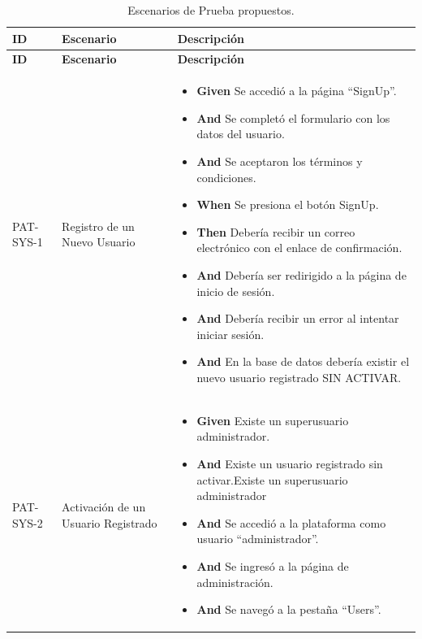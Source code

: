 \begin{longtable}{|p{1cm}|p{2.5cm}|p{12cm}|}
    \caption{Escenarios de Prueba propuestos.}\\
    \hline
    \textbf{ID} & \textbf{Escenario} & \textbf{Descripción} \\
    \hline
    \endfirsthead
    
    \hline
    \textbf{ID} & \textbf{Escenario} & \textbf{Descripción} \\
    \hline
    \endhead
    
    PAT-SYS-1 & Registro de un Nuevo Usuario & 
        \begin{itemize}
            \item \textbf{Given} Se accedió a la página ``SignUp''.
            \item \textbf{And} Se completó el formulario con los datos del usuario.
            \item \textbf{And} Se aceptaron los términos y condiciones.
            \newline
            \item \textbf{When} Se presiona el botón SignUp.
            \newline
            \item \textbf{Then} Debería recibir un correo electrónico con el enlace de confirmación.
            \item \textbf{And} Debería ser redirigido a la página de inicio de sesión.
            \item \textbf{And} Debería recibir un error al intentar iniciar sesión.
            \item \textbf{And} En la base de datos debería existir el nuevo usuario registrado SIN ACTIVAR.
        \end{itemize} \\
    \hline
    PAT-SYS-2 & Activación de un Usuario Registrado & 
    \begin{itemize}
        \item \textbf{Given} Existe un superusuario administrador.
        \item \textbf{And} Existe un usuario registrado sin activar.Existe un superusuario administrador
        \item \textbf{And} Se accedió a la plataforma como usuario ``administrador''.
        \item \textbf{And} Se ingresó a la página de administración.
        \item \textbf{And} Se navegó a la pestaña ``Users''.
        \newline

\end{itemize}
\end{longtable}

